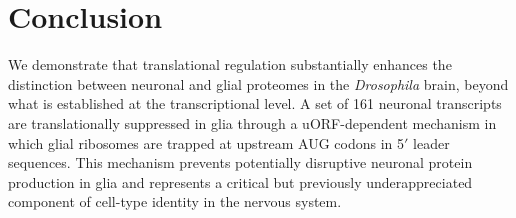 \documentclass[12pt]{article}
\begin{document}
\section{Conclusion}

We demonstrate that translational regulation substantially enhances the distinction between neuronal and glial proteomes in the \textit{Drosophila} brain, beyond what is established at the transcriptional level. A set of 161 neuronal transcripts are translationally suppressed in glia through a uORF-dependent mechanism in which glial ribosomes are trapped at upstream AUG codons in 5$'$ leader sequences. This mechanism prevents potentially disruptive neuronal protein production in glia and represents a critical but previously underappreciated component of cell-type identity in the nervous system.



\end{document}
